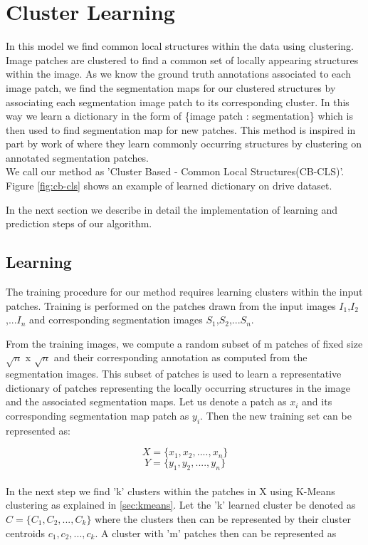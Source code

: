 
\section{Cluster Learning}
In this model we find common local structures within the data using clustering. Image patches are clustered to find a common set of locally appearing structures within the image. As we know the ground truth annotations associated to each image patch, we find the segmentation maps for our clustered structures by associating each segmentation image patch to its corresponding cluster. In this way we learn a dictionary in the form of \{image patch : segmentation\} which is then used to find segmentation map for new patches. This method is inspired in part by work of \citet{lim2013sketch} where they learn commonly occurring structures by clustering on annotated segmentation patches.\\
We call our method as 'Cluster Based - Common Local Structures(CB-CLS)'. Figure \ref{fig:cb-cls} shows an example of learned dictionary on drive dataset.

In the next section we describe in detail the implementation of learning and prediction steps of our algorithm.

\subsection{Learning}

The training procedure for our method requires learning clusters within the input patches. Training is performed on the patches drawn from the input images $I_1$,$I_2$,...$I_n$ and corresponding segmentation images $S_1$,$S_2$,...$S_n$. 

From the training images, we compute a random subset of m patches of fixed size $\sqrt{n}$ x $\sqrt{n}$ and their corresponding annotation as computed from the segmentation images. This subset of patches is used to learn a representative dictionary of patches representing the locally occurring structures in the image and the associated segmentation maps. Let us denote a patch as $x_i$ and its corresponding segmentation map patch as $y_i$. Then the new training set can be represented as:

$$
X = \{x_1,x_2,....,x_n\}
$$
$$
Y = \{y_1,y_2,....,y_n\}
$$
\\
In the next step we find 'k' clusters within the patches in X using K-Means clustering as explained in \ref{sec:kmeans}. Let the 'k' learned cluster be denoted as $C = \{C_1,C_2,...,C_k\} $ where the clusters then can be represented by their cluster centroids $c_1, c_2,..., c_k$. A cluster with 'm' patches then can be represented as

